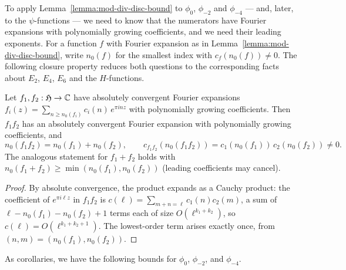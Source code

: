 To apply Lemma~\ref{lemma:mod-div-disc-bound} to $\phi_0$, $\phi_{-2}$ and $\phi_{-4}$ --- and, later, to the $\psi$-functions --- we need to know that the numerators have Fourier expansions with polynomially growing coefficients, and we need their leading exponents. For a function $f$ with Fourier expansion as in Lemma~\ref{lemma:mod-div-disc-bound}, write $n_0(f)$ for the smallest index with $c_f(n_0(f)) \neq 0$. The following closure property reduces both questions to the corresponding facts about $E_2$, $E_4$, $E_6$ and the $H$-functions.

\begin{lemma}\label{lemma:poly-growth-mul}
Let $f_1, f_2 : \mathfrak{H} \to \mathbb{C}$ have absolutely convergent Fourier expansions $f_i(z) = \sum_{n \geq n_0(f_i)} c_i(n)\, e^{\pi i n z}$ with polynomially growing coefficients. Then $f_1 f_2$ has an absolutely convergent Fourier expansion with polynomially growing coefficients, and
\[
  n_0(f_1 f_2) = n_0(f_1) + n_0(f_2), \qquad c_{f_1 f_2}(n_0(f_1 f_2)) = c_1(n_0(f_1))\, c_2(n_0(f_2)) \neq 0.
\]
The analogous statement for $f_1 + f_2$ holds with $n_0(f_1 + f_2) \geq \min(n_0(f_1), n_0(f_2))$ (leading coefficients may cancel).
\end{lemma}
\begin{proof}
By absolute convergence, the product expands as a Cauchy product: the coefficient of $e^{\pi i \ell z}$ in $f_1 f_2$ is $c(\ell) = \sum_{m + n = \ell} c_1(n) c_2(m)$, a sum of $\ell - n_0(f_1) - n_0(f_2) + 1$ terms each of size $O(\ell^{k_1 + k_2})$, so $c(\ell) = O(\ell^{k_1 + k_2 + 1})$. The lowest-order term arises exactly once, from $(n, m) = (n_0(f_1), n_0(f_2))$.
\end{proof}

As corollaries, we have the following bounds for $\phi_0$, $\phi_{-2}$, and $\phi_{-4}$.

